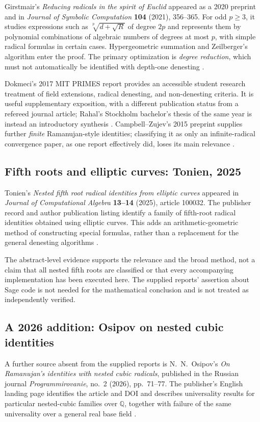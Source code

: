\documentclass[11pt,oneside]{article}
\numberwithin{equation}{section}
\theoremstyle{definition}
\theoremstyle{remark}
\newcommand{\Q}{\mathbb{Q}}
\begin{document}
Girstmair's \emph{Reducing radicals in the spirit of Euclid} appeared as a 2020 preprint and in \emph{Journal of Symbolic Computation} \textbf{104} (2021), 356--365. For odd $p\ge3$, it studies expressions such as $\sqrt[p]{d+\sqrt R}$ of degree $2p$ and represents them by polynomial combinations of algebraic numbers of degrees at most $p$, with simple radical formulas in certain cases. Hypergeometric summation and Zeilberger's algorithm enter the proof. The primary optimization is \emph{degree reduction}, which must not automatically be identified with depth-one denesting \cite{girstmair}.

Dokmeci's 2017 MIT PRIMES report provides an accessible student research treatment of field extensions, radical denesting, and non-denesting criteria. It is useful supplementary exposition, with a different publication status from a refereed journal article; Rahal's Stockholm bachelor's thesis of the same year is instead an introductory synthesis \cite{dokmeci,rahal}. Campbell--Zujev's 2015 preprint supplies further \emph{finite} Ramanujan-style identities; classifying it as only an infinite-radical convergence paper, as one report effectively did, loses its main relevance \cite{campbell}.

\subsection{Fifth roots and elliptic curves: Tonien, 2025}
Tonien's \emph{Nested fifth root radical identities from elliptic curves} appeared in \emph{Journal of Computational Algebra} \textbf{13--14} (2025), article 100032. The publisher record and author publication listing identify a family of fifth-root radical identities obtained using elliptic curves. This adds an arithmetic-geometric method of constructing special formulas, rather than a replacement for the general denesting algorithms \cite{tonien}.

The abstract-level evidence supports the relevance and the broad method, not a claim that all nested fifth roots are classified or that every accompanying implementation has been executed here. The supplied reports' assertion about Sage code is not needed for the mathematical conclusion and is not treated as independently verified.

\subsection{A 2026 addition: Osipov on nested cubic identities}
A further source absent from the supplied reports is N.~N.~Osipov's \emph{On Ramanujan's identities with nested cubic radicals}, published in the Russian journal \emph{Programmirovanie}, no.~2 (2026), pp.~71--77. The publisher's English landing page identifies the article and DOI and describes universality results for particular nested-cubic families over $\Q$, together with failure of the same universality over a general real base field \cite{osipov26}.
\end{document}

